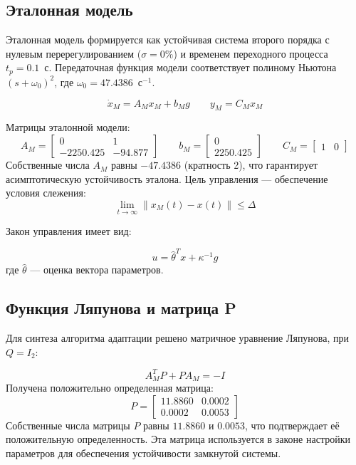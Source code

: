 \documentclass[a4paper,12pt]{article}
\begin{document}
\subsection{Эталонная модель}
Эталонная модель формируется как устойчивая система второго порядка с нулевым перерегулированием ($\sigma = 0\%$) и временем переходного процесса $t_p = 0{.}1$~с. Передаточная функция модели соответствует полиному Ньютона $(s+\omega_0)^2$, где $\omega_0 = 47{.}4386$~с$^{-1}$.

\begin{equation}
	\dot{x}_M = A_M x_M + b_M g \qquad y_M = C_M x_M
	\label{eq:oM}
\end{equation}

Матрицы эталонной модели:
\begin{equation}
	A_M = \begin{bmatrix} 0 & 1 \\ -2250.425 & -94.877 \end{bmatrix} \qquad 
	b_M = \begin{bmatrix} 0 \\ 2250.425 \end{bmatrix} \qquad 
	C_M = \begin{bmatrix} 1 & 0 \end{bmatrix}
\end{equation}
Собственные числа $A_M$ равны $-47.4386$ (кратность 2), что гарантирует асимптотическую устойчивость эталона. Цель управления --- обеспечение условия слежения: 
\begin{equation}
	\lim_{t\to\infty} \|x_M(t) - x(t)\| \leq \Delta
\end{equation}


Закон управления имеет вид:

\begin{equation}
	u = \hat{\theta}^T x + \kappa^{-1}g
\end{equation}
где $\hat{\theta}$ --- оценка вектора параметров. 

\subsection{Функция Ляпунова и матрица P}
Для синтеза алгоритма адаптации решено матричное уравнение Ляпунова, при $Q=I_2$:

\begin{equation}
	A_M^T P + P A_M = -I
\end{equation}
Получена положительно определенная матрица:
\begin{equation}
	P = \begin{bmatrix} 11.8860 & 0.0002 \\ 0.0002 & 0.0053 \end{bmatrix}
\end{equation}
Собственные числа матрицы $P$ равны $11.8860$ и $0.0053$, что подтверждает её положительную определенность. Эта матрица используется в законе настройки параметров для обеспечения устойчивости замкнутой системы.
\end{document}
